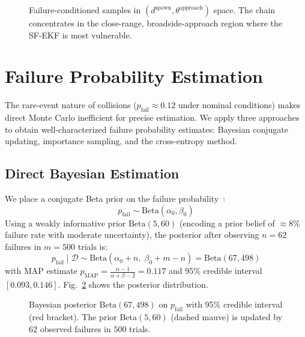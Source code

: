 \documentclass[conference]{IEEEtran}
\begin{document}
\begin{figure}[H]
    \centering
    
    \caption{Failure-conditioned samples in $(d^{\text{spawn}}, \theta^{\text{approach}})$ space. The chain concentrates in the close-range, broadside-approach region where the SF-EKF is most vulnerable.}
    \label{fig:failure_dist}
\end{figure}
\section{Failure Probability Estimation}
\label{sec:failure_prob}

The rare-event nature of collisions ($p_{\text{fail}} \approx 0.12$ under nominal conditions) makes direct Monte Carlo inefficient for precise estimation. We apply three approaches to obtain well-characterized failure probability estimates: Bayesian conjugate updating, importance sampling, and the cross-entropy method.

\subsection{Direct Bayesian Estimation}
\label{sec:bayesian}

We place a conjugate Beta prior on the failure probability~\cite{kochenderfer2025validation}:
\begin{equation}
    p_{\text{fail}} \sim \mathrm{Beta}(\alpha_0, \beta_0)
\end{equation}
Using a weakly informative prior $\mathrm{Beta}(5, 60)$ (encoding a prior belief of $\approx$8\% failure rate with moderate uncertainty), the posterior after observing $n = 62$ failures in $m = 500$ trials is:
\begin{equation}
    p_{\text{fail}} \mid \mathcal{D} \sim \mathrm{Beta}(\alpha_0 + n, \; \beta_0 + m - n) = \mathrm{Beta}(67, 498)
\end{equation}
with MAP estimate $\hat{p}_{\text{MAP}} = \frac{\alpha - 1}{\alpha + \beta - 2} = 0.117$ and 95\% credible interval $[0.093, 0.146]$. Fig.~\ref{fig:bayesian} shows the posterior distribution.

\begin{figure}[H]
    \centering
    
    \caption{Bayesian posterior $\mathrm{Beta}(67, 498)$ on $p_{\text{fail}}$ with 95\% credible interval (red bracket). The prior $\mathrm{Beta}(5, 60)$ (dashed mauve) is updated by $62$ observed failures in $500$ trials.}
    \label{fig:bayesian}
\end{figure}
\end{document}
